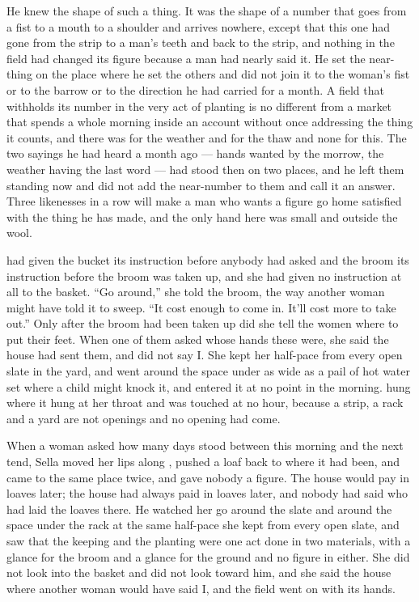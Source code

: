 He knew the shape of such a thing. It was the shape of a number that goes from a fist to a mouth to a shoulder and arrives nowhere, except that this one had gone from the strip to a man's teeth and back to the strip, and nothing in the field had changed its figure because a man had nearly said it. He set the near-thing on the place where he set the others and did not join it to the woman's fist or to the barrow or to the direction he had carried for a month. A field that withholds its number in the very act of planting is no different from a market that spends a whole morning inside an account without once addressing the thing it counts, and there was  for the weather and for the thaw and none for this. The two sayings he had heard a month ago --- hands wanted by the morrow, the weather having the last word --- had stood then on two places, and he left them standing now and did not add the near-number to them and call it an answer. Three likenesses in a row will make a man who wants a figure go home satisfied with the thing he has made, and the only hand here was small and outside the wool.

\scenebreak

 had given the bucket its instruction before anybody had asked and the broom its instruction before the broom was taken up, and she had given no instruction at all to the basket. “Go around,” she told the broom, the way another woman might have told it to sweep. “It cost enough to come in. It'll cost more to take out.” Only after the broom had been taken up did she tell the women where to put their feet. When one of them asked whose hands these were, she said the house had sent them, and did not say I. She kept her half-pace from every open slate in the yard, and went around the space under  as wide as a pail of hot water set where a child might knock it, and entered it at no point in the morning.  hung where it hung at her throat and was touched at no hour, because a strip, a rack and a yard are not openings and no opening had come.

When a woman asked how many days stood between this morning and the next tend, Sella moved her lips along , pushed a loaf back to where it had been, and came to the same place twice, and gave nobody a figure. The house would pay in loaves later; the house had always paid in loaves later, and nobody had said who had laid the loaves there. He watched her go around the slate and around the space under the rack at the same half-pace she kept from every open slate, and saw that the keeping and the planting were one act done in two materials, with a glance for the broom and a glance for the ground and no figure in either. She did not look into the basket and did not look toward him, and she said the house where another woman would have said I, and the field went on with its hands.

